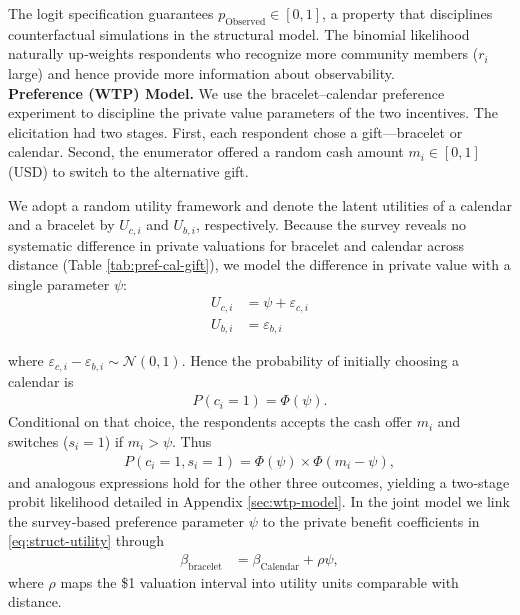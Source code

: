 \documentclass[12pt,a4paper]{article}
\begin{document}
The logit specification guarantees \(p_{\text{Observed}}\in[0,1]\), a property that disciplines counterfactual simulations in the structural model.  The binomial likelihood naturally up‑weights respondents who recognize more community members (\(r_i\) large) and hence provide more information about observability. \\

\textbf{Preference (WTP) Model.} We use the bracelet–calendar preference experiment to discipline the private value parameters of the two incentives. The elicitation had two stages. First, each respondent chose a gift—bracelet or calendar. Second, the enumerator offered a random cash amount \(m_i\in[0,1]\) (USD) to switch to the alternative gift.

We adopt a random utility framework and denote the latent utilities of a calendar and a bracelet by $U_{c,i}$ and $U_{b,i}$, respectively.  Because the survey reveals no systematic difference in private valuations for bracelet and calendar across distance (Table \ref{tab:pref-cal-gift}), we model the difference in private value with a single parameter \(\psi\):
\begin{align*}
    U_{c,i} &= \psi + \varepsilon_{c,i} \\
    U_{b,i} &= \varepsilon_{b,i}
\end{align*}

where \(\varepsilon_{c,i}-\varepsilon_{b,i}\sim\mathcal N(0,1)\).  
Hence the probability of initially choosing a calendar is
\begin{align*}
    P(c_{i} = 1) = \Phi(\psi).
\end{align*}
Conditional on that choice, the respondents accepts the cash offer \(m_i\) and switches (\(s_i=1\)) if \(m_i>\psi\). Thus
\begin{align*}
    P(c_{i} = 1, s_{i} = 1) = \Phi(\psi) \times \Phi\left(m_i - \psi \right),
\end{align*}
and analogous expressions hold for the other three outcomes, yielding a two‑stage probit likelihood detailed in Appendix \ref{sec:wtp-model}. 
In the joint model we link the survey‑based preference parameter \(\psi\) to the private benefit coefficients in  \eqref{eq:struct-utility} through 
\begin{align*}
    \beta_{\textrm{bracelet}} &= \beta_{\textrm{Calendar}} + \rho \psi,
\end{align*}
where \(\rho\) maps the \$1 valuation interval into utility units comparable with distance. \\ 
\end{document}
